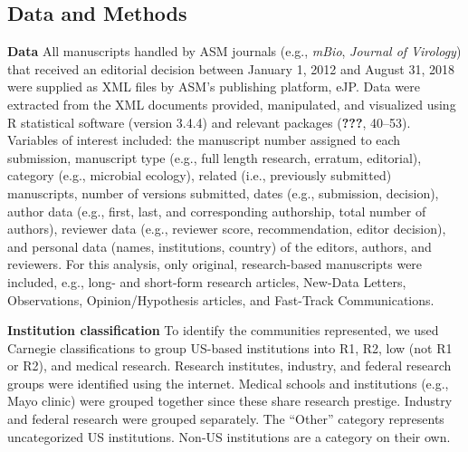 \documentclass[11pt,]{article}
\begin{document}
\subsection{Data and Methods}\label{data-and-methods}

\textbf{Data} All manuscripts handled by ASM journals (e.g.,
\emph{mBio}, \emph{Journal of Virology}) that received an editorial
decision between January 1, 2012 and August 31, 2018 were supplied as
XML files by ASM's publishing platform, eJP. Data were extracted from
the XML documents provided, manipulated, and visualized using R
statistical software (version 3.4.4) and relevant packages
({\textbf{???}}, 40--53). Variables of interest included: the manuscript
number assigned to each submission, manuscript type (e.g., full length
research, erratum, editorial), category (e.g., microbial ecology),
related (i.e., previously submitted) manuscripts, number of versions
submitted, dates (e.g., submission, decision), author data (e.g., first,
last, and corresponding authorship, total number of authors), reviewer
data (e.g., reviewer score, recommendation, editor decision), and
personal data (names, institutions, country) of the editors, authors,
and reviewers. For this analysis, only original, research-based
manuscripts were included, e.g., long- and short-form research articles,
New-Data Letters, Observations, Opinion/Hypothesis articles, and
Fast-Track Communications.

\textbf{Institution classification} To identify the communities
represented, we used Carnegie classifications to group US-based
institutions into R1, R2, low (not R1 or R2), and medical research.
Research institutes, industry, and federal research groups were
identified using the internet. Medical schools and institutions (e.g.,
Mayo clinic) were grouped together since these share research prestige.
Industry and federal research were grouped separately. The ``Other''
category represents uncategorized US institutions. Non-US institutions
are a category on their own.
\end{document}
